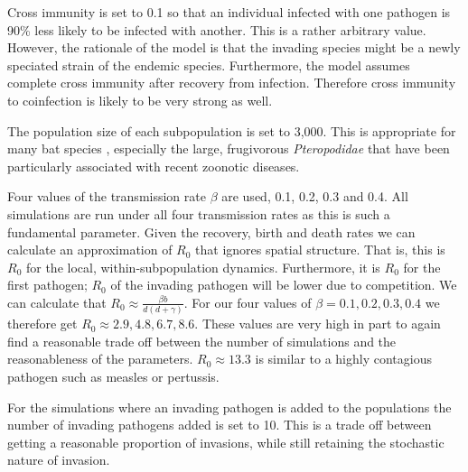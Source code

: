 Cross immunity is set to 0.1 so that an individual infected with one pathogen is 90\% less likely to be infected with another.
This is a rather arbitrary value.
However, the rationale of the model is that the invading species might be a newly speciated strain of the endemic species.
Furthermore, the model assumes complete cross immunity after recovery from infection.
Therefore cross immunity to coinfection is likely to be very strong as well.

The population size of each subpopulation is set to 3,000. 
This is appropriate for many bat species \cite{jones2009pantheria}, especially the large, frugivorous \emph{Pteropodidae} that have been particularly associated with recent zoonotic diseases.


Four values of the transmission rate $\beta$ are used, 0.1, 0.2, 0.3 and 0.4.
All simulations are run under all four transmission rates as this is such a fundamental parameter.
Given the recovery, birth and death rates we can calculate an approximation of $R_0$ that ignores spatial structure.
That is, this is $R_0$ for the local, within-subpopulation dynamics.
Furthermore, it is $R_0$ for the first pathogen; $R_0$ of the invading pathogen will be lower due to competition.
We can calculate that $R_0 \approx \frac{\beta b}{d(d+ \gamma)}$.
For our four values of $\beta = 0.1, 0.2, 0.3, 0.4$ we therefore get $R_0 \approx 2.9, 4.8, 6.7, 8.6$.
These values are very high in part to again find a reasonable trade off between the number of simulations and the reasonableness of the parameters.
$R_0 \approx 13.3$ is similar to a highly contagious pathogen such as measles or pertussis. 



For the simulations where an invading pathogen is added to the populations the number of invading pathogens added is set to 10. 
This is a trade off between getting a reasonable proportion of invasions, while still retaining the stochastic nature of invasion.














